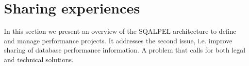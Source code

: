 \documentclass{cidr-2019}
\begin{document}





\section{Sharing experiences}\label{sharing}
In this section we present an overview of the {\sc SQALPEL} architecture to
define and manage performance projects. It addresses the second issue, i.e. improve sharing of database performance information. A problem that calls for both legal and technical solutions.
\end{document}
